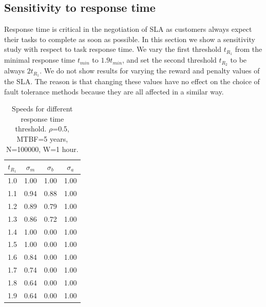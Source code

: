 \subsection{Sensitivity to response time}

Response time is critical in the negotiation of SLA as customers
always expect their tasks to complete as soon as possible. In this
section we show a sensitivity study with respect to task response
time. We vary the first threshold $t_{R_1}$ from the minimal response
time $t_{min}$ to $1.9t_{min}$, and set the second threshold $t_{R_2}$
to be always $2t_{R_1}$. We do not show results for varying the reward
and penalty values of the SLA. The reason is that changing these
values have no effect on the choice of fault tolerance methods because
they are all affected in a similar way.

\begin{table}[!h]\small
	\caption{Speeds for different response time threshold. $\rho$=0.5, MTBF=5 years, N=100000, W=1 hour.}
	\centering
		\begin{tabular}{|c|c|c|c|}
		\hline
		$t_{R_1}$ & $\sigma_m$ & $\sigma_b$ & $\sigma_a$ \\
		\hline
		1.0	&	1.00 & 	1.00 &	1.00 \\
		\hline
		1.1	&	0.94 &	0.88 &	1.00 \\
		\hline
		1.2	&	0.89 &	0.79 &	1.00 \\
		\hline
		1.3	&	0.86 &	0.72 &	1.00 \\
		\hline
		1.4	&	1.00 &	0.00 &	1.00 \\
		\hline
		1.5	&	1.00 &	0.00 &	1.00 \\
		\hline
		1.6	&	0.84 &	0.00 &	1.00 \\
		\hline
		1.7	&	0.74 &	0.00 &	1.00 \\
		\hline
		1.8	&	0.64 &	0.00 &	1.00 \\
		\hline
		1.9	&	0.64 &	0.00 &	1.00 \\
		\hline
		\end{tabular}
	\label{tbl:t}
\end{table}

